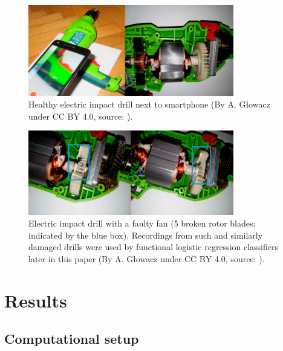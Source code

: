 \documentclass[energies,article,submit,pdftex,moreauthors]{Definitions/mdpi}
\begin{document}
\vspace{5mm}
\begin{figure}[H]
\centering
\includegraphics[width=0.8\textwidth]{images/drill-healthy}
\caption{Healthy electric impact drill next to smartphone (By A. Głowacz under CC BY 4.0, source: \cite{ref-motors}).}
\end{figure}
\unskip
\vspace{5mm}

\begin{figure}[H]
\centering
\includegraphics[width=0.8\textwidth]{images/drill-broken-teeth}
\caption{Electric impact drill with a faulty fan (5 broken rotor blades; indicated by the blue box). Recordings from such and similarly damaged drills were used by functional logistic regression classifiers later in this paper (By A. Głowacz under CC BY 4.0, source: \cite{ref-motors}).}
\end{figure}
\unskip
\vspace{5mm}

\section{Results}

\subsection{Computational setup}
\end{document}
